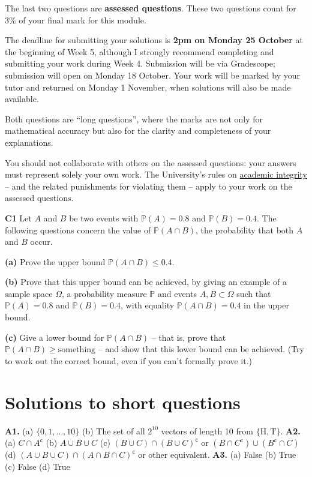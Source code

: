\documentclass[
  a4paper,
]{book}
\theoremstyle{definition}
\theoremstyle{definition}
\theoremstyle{definition}
\theoremstyle{definition}
\theoremstyle{remark}
\begin{document}
The last two questions are \textbf{assessed questions}. These two questions count for 3\% of your final mark for this module.

The deadline for submitting your solutions is \textbf{2pm on Monday 25 October} at the beginning of Week 5, although I strongly recommend completing and submitting your work during Week 4. Submission will be via Gradescope; submission will open on Monday 18 October.
Your work will be marked by your tutor and returned on Monday 1 November, when solutions will also be made available.

Both questions are ``long questions'', where the marks are not only for mathematical accuracy but also for the clarity and completeness of your explanations.

You should not collaborate with others on the assessed questions: your answers must represent solely your own work. The University's rules on \href{https://library.leeds.ac.uk/info/1401/academic_skills/46/academic_integrity_and_plagiarism}{academic integrity} -- and the related punishments for violating them -- apply to your work on the assessed questions.

\textbf{C1} Let \(A\) and \(B\) be two events with \(\mathbb P(A) = 0.8\) and \(\mathbb P(B) = 0.4\). The following questions concern the value of \(\mathbb P(A \cap B)\), the probability that both \(A\) and \(B\) occur.

\textbf{(a)} Prove the upper bound \(\mathbb P(A \cap B) \leq 0.4\).

\textbf{(b)} Prove that this upper bound can be achieved, by giving an example of a sample space \(\Omega\), a probability measure \(\mathbb P\) and events \(A, B \subset \Omega\) such that \(\mathbb P(A) = 0.8\) and \(\mathbb P(B) = 0.4\), with equality \(\mathbb P(A \cap B) = 0.4\) in the upper bound.

\textbf{(c)} Give a lower bound for \(\mathbb P(A \cap B)\) -- that is, prove that \(\mathbb P(A \cap B) \geq \text{something}\) -- and show that this lower bound can be achieved. (Try to work out the correct bound, even if you can't formally prove it.)

\hypertarget{P2-short-sols}{%
\section*{Solutions to short questions}\label{P2-short-sols}}

\textbf{A1.} (a) \(\{0,1,\dots, 10\}\) (b) The set of all \(2^{10}\) vectors of length 10 from \(\{\text{H}, \text{T}\}\). \textbf{A2.} (a) \(C \cap A^\mathsf{c}\) (b) \(A \cup B \cup C\) (c) \((B \cup C) \cap (B \cup C)^\mathsf{c}\) or \((B \cap C^\mathsf{c}) \cup (B^\mathsf{c}\cap C)\) (d) \((A \cup B \cup C) \cap (A \cap B \cap C)^\mathsf{c}\) or other equivalent. \textbf{A3.} (a) False (b) True (c) False (d) True
\end{document}
